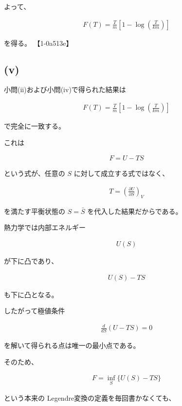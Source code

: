 \documentclass[platex,dvipdfmx,a4paper]{jsarticle}
\begin{document}
よって、

\begin{align*}
F(T)
=
\frac{T}{m}
\left[
1-
\log
\left(
\frac{T}{km}
\right)
\right]
\end{align*}

を得る。 【1-0a513e】

\subsection{(v)}

小問(ii)および小問(iv)で得られた結果は

\begin{align*}
F(T)
=
\frac{T}{m}
\left[
1-
\log
\left(
\frac{T}{km}
\right)
\right]
\end{align*}

で完全に一致する。

これは

\begin{align*}
F
=
U-TS
\end{align*}

という式が、任意の $S$ に対して成立する式ではなく、

\begin{align*}
T
=
\left(
\frac{\partial U}{\partial S}
\right)_V
\end{align*}

を満たす平衡状態の $S=\bar S$ を代入した結果だからである。

熱力学では内部エネルギー

\begin{align*}
U(S)
\end{align*}

が下に凸であり、

\begin{align*}
U(S)-TS
\end{align*}

も下に凸となる。

したがって極値条件

\begin{align*}
\frac{d}{dS}
\left(
U-TS
\right)
=
0
\end{align*}

を解いて得られる点は唯一の最小点である。

そのため、

\begin{align*}
F
=
\inf_S\{U(S)-TS\}
\end{align*}

という本来の Legendre変換の定義を毎回書かなくても、
\end{document}
